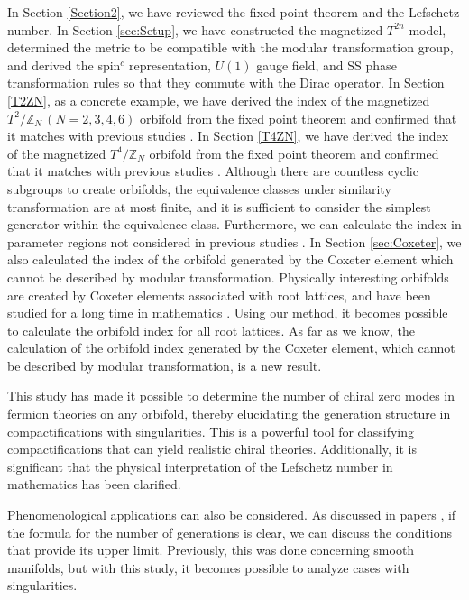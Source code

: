 \documentclass[11pt]{article}
\newcommand{\fix}[1]{\textcolor{red}{[#1]}}
\begin{document}
In Section \ref{Section2}, we have reviewed the fixed point theorem and the Lefschetz number.
In Section \ref{sec:Setup}, we have constructed the magnetized 
$T^{2n}$ model, determined the metric to be compatible with the modular transformation group, and derived the spin$^c$ representation, 
$U(1)$ gauge field, and SS phase transformation rules so that they commute with the Dirac operator.
In Section \ref{T2ZN}, as a concrete example, we have derived the index of the magnetized 
$T^{2}/\mathbb{Z}_N\,(N=2,3,4,6)$ orbifold from the fixed point theorem and confirmed that it matches with previous studies \cite{Sakamoto:2020pev,Kobayashi:2022tti,Imai:2022bke}.
In Section \ref{T4ZN}, we have derived the index of the magnetized 
$T^{4}/\mathbb{Z}_N$
  orbifold from the fixed point theorem and confirmed that it matches with previous studies \cite{Kikuchi:2022lfv,Kikuchi:2022psj}. Although there are countless cyclic subgroups to create orbifolds, the equivalence classes under similarity transformation are at most finite, and it is sufficient to consider the simplest generator within the equivalence class. Furthermore, we can calculate the index in parameter regions not considered in previous studies \cite{Kikuchi:2022lfv,Kikuchi:2022psj}.
In Section \ref{sec:Coxeter}, we also calculated the index of the orbifold generated by the Coxeter element which cannot be described by modular transformation. Physically interesting orbifolds are created by Coxeter elements associated with root lattices, and have been studied for a long time in mathematics \cite{Dixon:1985jw, Dixon:1986jc, Bailin:1999nk}. Using our method, it becomes possible to calculate the orbifold index for all root lattices. As far as we know, the calculation of the orbifold index generated by the Coxeter element, which cannot be described by modular transformation, is a new result.

This study has made it possible to determine the number of chiral zero modes in fermion theories on any orbifold, thereby elucidating the generation structure in compactifications with singularities. This is a powerful tool for classifying compactifications that can yield realistic chiral theories. Additionally, it is significant that the physical interpretation of the Lefschetz number in mathematics has been clarified.

Phenomenological applications can also be considered. As discussed in papers \cite{Takeuchi:2023egl,Ishiguro:2020rot}, %
if the formula for the number of generations is clear, we can discuss the conditions that provide its upper limit. Previously, this was done concerning smooth manifolds, but with this study, it becomes possible to analyze cases with singularities.
\end{document}
